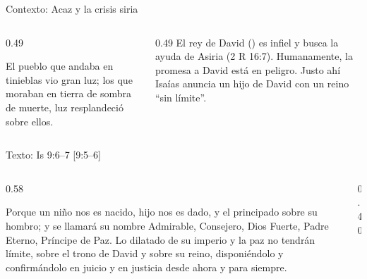\begin{frame}{Contexto: Acaz y la crisis siria}
\centering
{}\par\medskip
\begin{columns}[t,onlytextwidth]
\begin{column}{0.49\textwidth}
\begin{cita}El pueblo que andaba en tinieblas vio gran luz; los que moraban en tierra de sombra de muerte, luz resplandeció sobre ellos.\end{cita}
\end{column}
\begin{column}{0.49\textwidth}\small
El rey de David () es infiel y busca la ayuda de Asiria (2 R 16:7). Humanamente, la promesa a David está en peligro. Justo ahí Isaías anuncia un hijo de David con un reino ``sin límite''.
\end{column}
\end{columns}
\end{frame}

\begin{frame}{Texto: Is 9:6--7 [9:5--6]}
\begin{columns}[c,onlytextwidth]
\begin{column}{0.58\textwidth}
\begin{cita}Porque un niño nos es nacido, hijo nos es dado, y el principado sobre su hombro; y se llamará su nombre Admirable, Consejero, Dios Fuerte, Padre Eterno, Príncipe de Paz. Lo dilatado de su imperio y la paz no tendrán límite, sobre el trono de David y sobre su reino, disponiéndolo y confirmándolo en juicio y en justicia desde ahora y para siempre. \end{cita}
\end{column}
\begin{column}{0.40\textwidth}\end{column}
\end{columns}
\end{frame}

